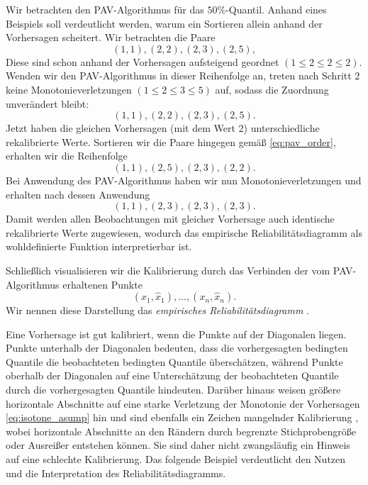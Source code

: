 \begin{bsp} \label{bsp:order_pav_explain}
Wir betrachten den PAV-Algorithmus für das $50\%$-Quantil. Anhand eines Beispiels soll verdeutlicht werden, warum ein Sortieren allein anhand der Vorhersagen scheitert. Wir betrachten die Paare
\[
(1,1), (2,2), (2,3), (2,5),
\]
Diese sind schon anhand der Vorhersagen aufsteigend geordnet  $(1 \le 2 \le 2 \le 2)$. Wenden wir den PAV-Algorithmus in dieser Reihenfolge an, treten nach Schritt $2$ keine Monotonieverletzungen $(1 \le 2 \le 3 \le 5)$ auf, sodass die Zuordnung unverändert bleibt:
\[
(1,1), (2,2), (2,3), (2,5).
\]
Jetzt haben die gleichen Vorhersagen (mit dem Wert $2$) unterschiedliche rekalibrierte Werte. Sortieren wir die Paare hingegen gemäß \eqref{eq:pav_order}, erhalten wir die Reihenfolge
\[
(1,1), (2,5), (2,3), (2,2).
\]
Bei Anwendung des PAV-Algorithmus haben wir nun Monotonieverletzungen und erhalten nach dessen Anwendung
\[
(1,1), (2,3), (2,3), (2,3).
\]
Damit werden allen Beobachtungen mit gleicher Vorhersage auch identische rekalibrierte Werte zugewiesen, wodurch das empirische Reliabilitätsdiagramm als wohldefinierte Funktion interpretierbar ist.\\
\end{bsp}

Schließlich visualisieren wir die Kalibrierung durch das Verbinden der vom PAV-Algorithmus erhaltenen Punkte
\[
(x_1,\hat x_1), \dotsc, (x_n,\hat x_n).
\]
Wir nennen diese Darstellung das \emph{empirisches Reliabilitätsdiagramm} \parencite{gneiting2023regression}.

Eine Vorhersage ist gut kalibriert, wenn die Punkte auf der Diagonalen liegen. Punkte unterhalb der Diagonalen bedeuten, dass die vorhergesagten bedingten Quantile die beobachteten bedingten Quantile überschätzen, während Punkte oberhalb der Diagonalen auf eine Unterschätzung der beobachteten Quantile durch die vorhergesagten Quantile hindeuten. Darüber hinaus weisen größere horizontale Abschnitte auf eine starke Verletzung der Monotonie der Vorhersagen \eqref{eq:isotone_asump} hin und sind ebenfalls ein Zeichen mangelnder Kalibrierung \parencite{gneiting2023regression}, wobei horizontale Abschnitte an den Rändern durch begrenzte Stichprobengröße oder Ausreißer entstehen können. Sie sind daher nicht zwangsläufig ein Hinweis auf eine schlechte Kalibrierung. Das folgende Beispiel verdeutlicht den Nutzen und die Interpretation des Reliabilitätsdiagramms.

